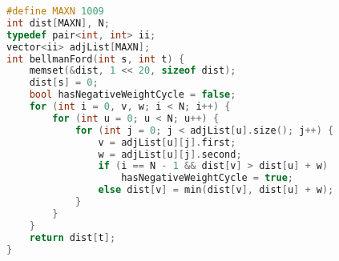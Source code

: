 \begin{lstlisting}[language=C++]
#define MAXN 1009
int dist[MAXN], N;
typedef pair<int, int> ii;
vector<ii> adjList[MAXN];
int bellmanFord(int s, int t) {
    memset(&dist, 1 << 20, sizeof dist);
    dist[s] = 0;
    bool hasNegativeWeightCycle = false;
    for (int i = 0, v, w; i < N; i++) {
        for (int u = 0; u < N; u++) {
            for (int j = 0; j < adjList[u].size(); j++) {
                v = adjList[u][j].first;
                w = adjList[u][j].second;
                if (i == N - 1 && dist[v] > dist[u] + w)
                    hasNegativeWeightCycle = true;
                else dist[v] = min(dist[v], dist[u] + w);
            }
        }
    }
    return dist[t];
}
\end{lstlisting}